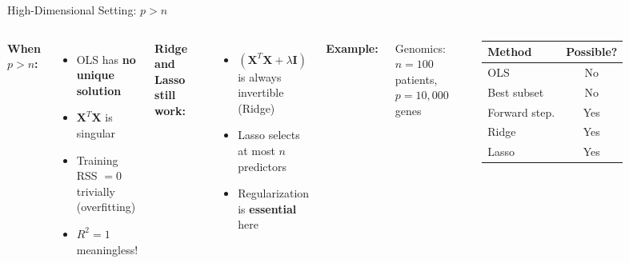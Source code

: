 \documentclass[aspectratio=169, 11pt]{beamer}
\begin{document}
\begin{frame}{High-Dimensional Setting: $p > n$}
\begin{columns}
\textbf{When $p > n$:}
\begin{itemize}
  \item OLS has \textbf{no unique solution}
  \item $\mathbf{X}^T\mathbf{X}$ is singular
  \item Training RSS $= 0$ trivially (overfitting)
  \item $R^2 = 1$ meaningless!
\end{itemize}
\vspace{0.3em}
\textbf{Ridge and Lasso still work:}
\begin{itemize}
  \item $(\mathbf{X}^T\mathbf{X} + \lambda\mathbf{I})$ is always invertible (Ridge)
  \item Lasso selects at most $n$ predictors
  \item Regularization is \textbf{essential} here
\end{itemize}
\textbf{Example:}

Genomics: $n = 100$ patients, $p = 10{,}000$ genes

\vspace{0.3em}
\begin{tabular}{lc}
\toprule
Method & Possible? \\
\midrule
OLS & \textcolor{softred}{No} \\
Best subset & \textcolor{softred}{No} \\
Forward step. & \textcolor{softgreen}{Yes} \\
Ridge & \textcolor{softgreen}{Yes} \\
Lasso & \textcolor{softgreen}{Yes} \\
\bottomrule
\end{tabular}
\end{columns}
\end{frame}
\end{document}

